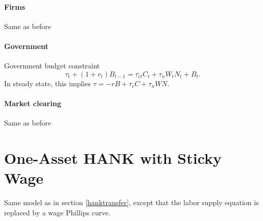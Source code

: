 \documentclass[11pt,a4paper]{article}
\begin{document}
\paragraph{Firms} Same as before


\paragraph{Government}
Government budget constraint
\begin{equation*}
\tau_t+(1+r_t)B_{t-1}=\tau_{ct}C_t+\tau_{n}W_tN_t+B_t.
\end{equation*}
In steady state, this implies $\tau=-rB+\tau_cC+\tau_nWN$.


\paragraph{Market clearing} Same as before




\section{One-Asset HANK with Sticky Wage}
\label{hanksticky}
Same model as in section \ref{hanktransfer}, except that the labor supply equation is replaced by a wage Phillips curve.
\end{document}
